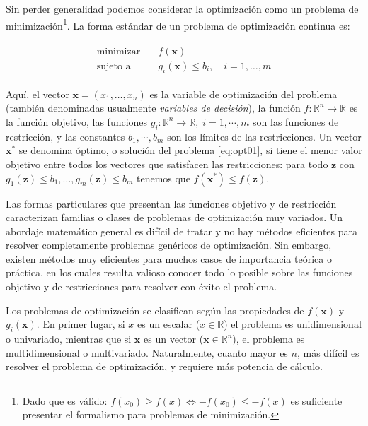 Sin perder generalidad podemos considerar la optimización como un problema de minimización\footnote{Dado que es válido: $f(x_0) \geq f(x) \Leftrightarrow -f(x_0) \leq -f(x)$ es suficiente presentar el formalismo para problemas de minimización.}. La forma estándar de un problema de optimización continua es: 

\begin{align}
 \begin{split}
 \text{minimizar}& \quad f(\bm{x}) \\
 \text{sujeto a}& \quad g_i(\bm{x}) \leq b_i, \quad i = 1, \ldots, m
 \end{split}
 \label{eq:opt01}
\end{align}

Aquí, el vector $\bm{x} = (x_1, \ldots, x_n)$ es la variable de optimización del problema (también denominadas usualmente \textit{variables de decisión}), la función $f: \mathbb{R}^n \rightarrow \mathbb{R}$ es la función objetivo, las funciones $g_i: \mathbb{R}^n \rightarrow \mathbb{R}, \; i = 1, \cdots, m$ son las funciones de restricción, y las constantes $b_1, \cdots, b_m$ son los límites de las restricciones. Un vector $\bm{x}^*$ se denomina óptimo, o solución del problema \eqref{eq:opt01}, si tiene el menor valor objetivo entre todos los vectores que satisfacen las restricciones: para todo $\bm{z}$ con $g_1(\bm{z}) \leq b_1, \ldots, g_m(\bm{z}) \leq b_m$ tenemos que $f(\bm{x}^*) \leq f(\bm{z})$. 

Las formas particulares que presentan las funciones objetivo y de restricción caracterizan familias o clases de problemas de optimización muy variados. Un abordaje matemático general es difícil de tratar y no hay métodos eficientes para resolver completamente problemas genéricos de optimización. Sin embargo, existen métodos muy eficientes para muchos casos de importancia teórica o práctica, en los cuales resulta valioso conocer todo lo posible sobre las funciones objetivo y de restricciones para resolver con éxito el problema.

Los problemas de optimización se clasifican según las propiedades de $f(\bm{x})$ y $g_i(\bm{x})$. En primer lugar, si $x$ es un escalar ($x \in \mathbb{R}$) el problema es unidimensional o univariado, mientras que si $\bm{x}$ es un vector ($\bm{x} \in \mathbb{R}^n$), el problema es multidimensional o multivariado. Naturalmente, cuanto mayor es $n$, más difícil es resolver el problema de optimización, y requiere más potencia de cálculo.

